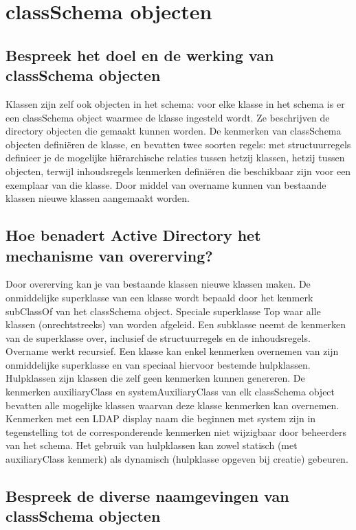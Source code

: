 \chapter{classSchema objecten}

\section{Bespreek het doel en de werking van classSchema objecten}

Klassen zijn zelf ook objecten in het schema: voor elke klasse in het schema is
er een classSchema object waarmee de klasse ingesteld wordt. Ze beschrijven de
directory objecten die gemaakt kunnen worden.
De kenmerken van classSchema objecten definiëren de klasse, en bevatten twee
soorten regels: met structuurregels definieer je de mogelijke hiërarchische
relaties tussen hetzij klassen, hetzij tussen objecten, terwijl inhoudsregels
kenmerken definiëren die beschikbaar zijn voor een exemplaar van die klasse.
Door middel van overname kunnen van bestaande klassen nieuwe klassen aangemaakt
worden.

\section{Hoe benadert Active Directory het mechanisme van overerving?}

Door overerving kan je van bestaande klassen nieuwe klassen maken. De
onmiddelijke superklasse van een klasse wordt bepaald door het kenmerk
subClassOf van het classSchema object. Speciale superklasse Top waar alle
klassen (onrechtstreeks) van worden afgeleid. Een subklasse neemt de kenmerken
van de superklasse over, inclusief de structuurregels en de inhoudsregels.
Overname werkt recursief.
Een klasse kan enkel kenmerken overnemen van zijn onmiddelijke superklasse en
van speciaal hiervoor bestemde hulpklassen. Hulpklassen zijn klassen die zelf
geen kenmerken kunnen genereren.
De kenmerken auxiliaryClass en systemAuxiliaryClass van elk classSchema object
bevatten alle mogelijke klassen waarvan deze klasse kenmerken kan overnemen.
Kenmerken met een LDAP display naam die beginnen met system zijn in
tegenstelling tot de corresponderende kenmerken niet wijzigbaar door beheerders
van het schema.
Het gebruik van hulpklassen kan zowel statisch (met auxiliaryClass kenmerk) als
dynamisch (hulpklasse opgeven bij creatie) gebeuren.

\section{Bespreek de diverse naamgevingen van classSchema objecten}

